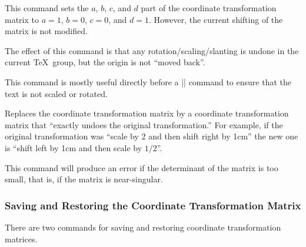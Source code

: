 \begin{command}{\pgftransformresetnontranslations}
    This command sets the $a$, $b$, $c$, and $d$ part of the coordinate
    transformation matrix to $a=1$, $b=0$, $c=0$, and $d=1$. However, the
    current shifting of the matrix is not modified.

    The effect of this command is that any rotation/scaling/slanting is undone
    in the current \TeX\ group, but the origin is not ``moved back''.

    This command is mostly useful directly before a |\pgftext| command to
    ensure that the text is not scaled or rotated.
\begin{codeexample}[]
\end{codeexample}
\end{command}

\begin{command}{\pgftransforminvert}
    Replaces the coordinate transformation matrix by a coordinate
    transformation matrix that ``exactly undoes the original transformation.''
    For example, if the original transformation was ``scale by 2 and then shift
    right by 1cm'' the new one is ``shift left by 1cm and then scale by
    $1/2$''.

    This command will produce an error if the determinant of the matrix is too
    small, that is, if the matrix is near-singular.
\begin{codeexample}[]
\end{codeexample}
\end{command}


\subsubsection{Saving and Restoring the Coordinate Transformation Matrix}

There are two commands for saving and restoring coordinate transformation
matrices.

